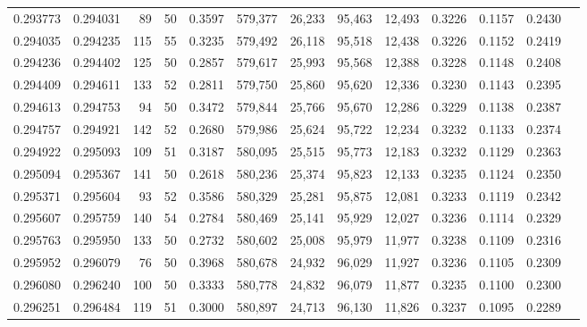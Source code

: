 \begin{tabular}{rrrrrrrrrrrrr}
0.293773 & 0.294031 &    89 &  50 &                                     0.3597 & 579,377 &  26,233 &  95,463 &  12,493 & 0.3226 & 0.1157 & 0.2430 \\
0.294035 & 0.294235 &   115 &  55 &                                     0.3235 & 579,492 &  26,118 &  95,518 &  12,438 & 0.3226 & 0.1152 & 0.2419 \\
0.294236 & 0.294402 &   125 &  50 &                                     0.2857 & 579,617 &  25,993 &  95,568 &  12,388 & 0.3228 & 0.1148 & 0.2408 \\
0.294409 & 0.294611 &   133 &  52 &                                     0.2811 & 579,750 &  25,860 &  95,620 &  12,336 & 0.3230 & 0.1143 & 0.2395 \\
0.294613 & 0.294753 &    94 &  50 &                                     0.3472 & 579,844 &  25,766 &  95,670 &  12,286 & 0.3229 & 0.1138 & 0.2387 \\
0.294757 & 0.294921 &   142 &  52 &                                     0.2680 & 579,986 &  25,624 &  95,722 &  12,234 & 0.3232 & 0.1133 & 0.2374 \\
0.294922 & 0.295093 &   109 &  51 &                                     0.3187 & 580,095 &  25,515 &  95,773 &  12,183 & 0.3232 & 0.1129 & 0.2363 \\
0.295094 & 0.295367 &   141 &  50 &                                     0.2618 & 580,236 &  25,374 &  95,823 &  12,133 & 0.3235 & 0.1124 & 0.2350 \\
0.295371 & 0.295604 &    93 &  52 &                                     0.3586 & 580,329 &  25,281 &  95,875 &  12,081 & 0.3233 & 0.1119 & 0.2342 \\
0.295607 & 0.295759 &   140 &  54 &                                     0.2784 & 580,469 &  25,141 &  95,929 &  12,027 & 0.3236 & 0.1114 & 0.2329 \\
0.295763 & 0.295950 &   133 &  50 &                                     0.2732 & 580,602 &  25,008 &  95,979 &  11,977 & 0.3238 & 0.1109 & 0.2316 \\
0.295952 & 0.296079 &    76 &  50 &                                     0.3968 & 580,678 &  24,932 &  96,029 &  11,927 & 0.3236 & 0.1105 & 0.2309 \\
0.296080 & 0.296240 &   100 &  50 &                                     0.3333 & 580,778 &  24,832 &  96,079 &  11,877 & 0.3235 & 0.1100 & 0.2300 \\
0.296251 & 0.296484 &   119 &  51 &                                     0.3000 & 580,897 &  24,713 &  96,130 &  11,826 & 0.3237 & 0.1095 & 0.2289 \\

\end{tabular}
